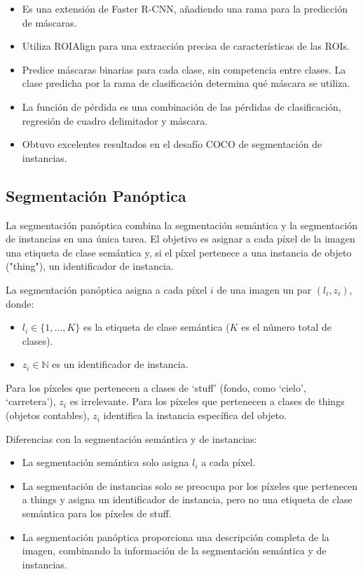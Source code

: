 \documentclass{article}
\begin{document}
\begin{itemize}
    \item Es una extensión de Faster R-CNN, añadiendo una rama para la predicción de máscaras.
    \item Utiliza ROIAlign para una extracción precisa de características de las ROIs.
    \item Predice máscaras binarias para cada clase, sin competencia entre clases.  La clase predicha por la rama de clasificación determina qué máscara se utiliza.
    \item La función de pérdida es una combinación de las pérdidas de clasificación, regresión de cuadro delimitador y máscara.
    \item Obtuvo excelentes resultados en el desafío COCO de segmentación de instancias.
\end{itemize}

\subsection{Segmentación Panóptica}

La segmentación panóptica combina la segmentación semántica y la segmentación de instancias en una única tarea.  El objetivo es asignar a cada píxel de la imagen una etiqueta de clase semántica y, si el píxel pertenece a una instancia de objeto ("thing"), un identificador de instancia.

La segmentación panóptica asigna a cada píxel \(i\) de una imagen un par \((l_i, z_i)\), donde:

\begin{itemize}
    \item \(l_i \in \{1, \ldots, K\}\) es la etiqueta de clase semántica (\(K\) es el número total de clases).
    \item \(z_i \in \mathbb{N}\) es un identificador de instancia.
\end{itemize}

Para los píxeles que pertenecen a clases de `stuff' (fondo, como `cielo', `carretera'), \(z_i\) es irrelevante.  Para los píxeles que pertenecen a clases de things (objetos contables), \(z_i\) identifica la instancia específica del objeto.

Diferencias con la segmentación semántica y de instancias:

\begin{itemize}
    \item La segmentación semántica solo asigna \(l_i\) a cada píxel.
    \item La segmentación de instancias solo se preocupa por los píxeles que pertenecen a things y asigna un identificador de instancia, pero no una etiqueta de clase semántica para los píxeles de stuff.
    \item La segmentación panóptica proporciona una descripción completa de la imagen, combinando la información de la segmentación semántica y de instancias.
\end{itemize}
\end{document}

